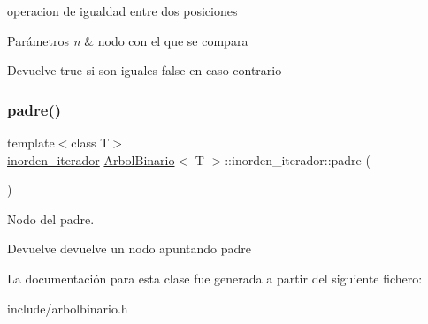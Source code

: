operacion de igualdad entre dos posiciones 


\begin{DoxyParams}{Parámetros}
{\em n} & nodo con el que se compara \\
\hline
\end{DoxyParams}
\begin{DoxyReturn}{Devuelve}
true si son iguales false en caso contrario 
\end{DoxyReturn}
\mbox{\label{classArbolBinario_1_1inorden__iterador_a3beb2133e8319be6791854b9c470a9c5}} 
\subsubsection{\texorpdfstring{padre()}{padre()}}
{\footnotesize\ttfamily template$<$class T$>$ \\
\hyperlink{classArbolBinario_1_1inorden__iterador}{inorden\+\_\+iterador} \hyperlink{classArbolBinario}{Arbol\+Binario}$<$ T $>$\+::inorden\+\_\+iterador\+::padre (\begin{DoxyParamCaption}{ }\end{DoxyParamCaption})\hspace{0.3cm}{\ttfamily [inline]}}



Nodo del padre. 

\begin{DoxyReturn}{Devuelve}
devuelve un nodo apuntando padre 
\end{DoxyReturn}


La documentación para esta clase fue generada a partir del siguiente fichero\+:\begin{DoxyCompactItemize}
\item 
include/arbolbinario.\+h\end{DoxyCompactItemize}

